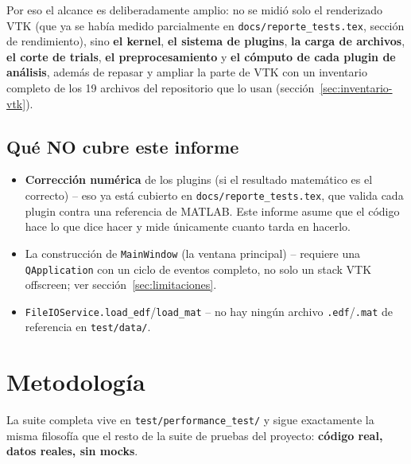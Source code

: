 \documentclass[11pt,a4paper]{article}
\begin{document}
Por eso el alcance es deliberadamente amplio: no se midió solo el renderizado VTK (que ya se había medido
parcialmente en \texttt{docs/reporte\_\allowbreak tests.tex}, sección de rendimiento), sino \textbf{el kernel},
\textbf{el sistema de plugins}, \textbf{la carga de archivos}, \textbf{el corte de trials}, \textbf{el
preprocesamiento} y \textbf{el cómputo de cada plugin de análisis}, además de repasar y ampliar la parte de
VTK con un inventario completo de los 19 archivos del repositorio que lo usan (sección~\ref{sec:inventario-vtk}).

\subsection{Qué NO cubre este informe}

\begin{itemize}[nosep]
  \item \textbf{Corrección numérica} de los plugins (si el resultado matemático es el correcto) -- eso ya
        está cubierto en \texttt{docs/reporte\_\allowbreak tests.tex}, que valida cada plugin contra una
        referencia de MATLAB. Este informe asume que el código hace lo que dice hacer y mide únicamente
        cuanto tarda en hacerlo.
  \item La construcción de \texttt{MainWindow} (la ventana principal) -- requiere una \texttt{QApplication}
        con un ciclo de eventos completo, no solo un stack VTK offscreen; ver
        sección~\ref{sec:limitaciones}.
  \item \texttt{FileIOService.load\_\allowbreak edf}/\texttt{load\_\allowbreak mat} -- no hay ningún archivo
        \texttt{.edf}/\texttt{.mat} de referencia en \texttt{test/data/}.
\end{itemize}

\section{Metodología}

La suite completa vive en \texttt{test/performance\_\allowbreak test/} y sigue exactamente la misma filosofía
que el resto de la suite de pruebas del proyecto: \textbf{código real, datos reales, sin mocks}.
\end{document}
